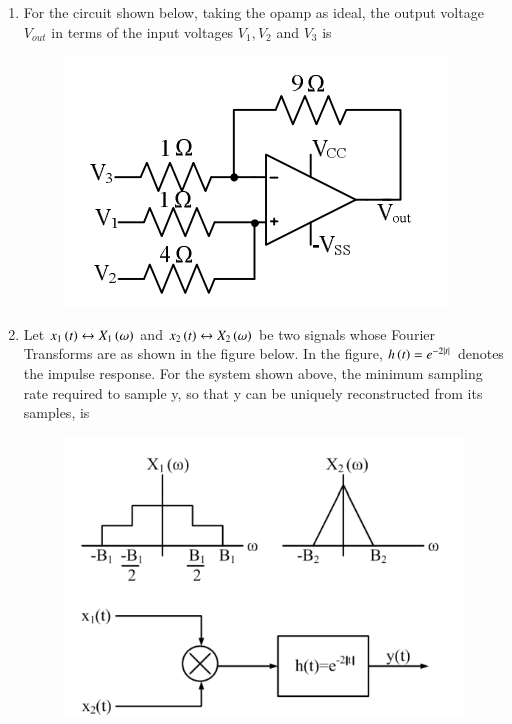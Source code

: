 \documentclass[journal,12pt,onecolumn]{IEEEtran}
\theoremstyle{remark}
\begin{document}
\begin{enumerate}[start=1, label=Q.\arabic*]
    \item For the circuit shown below, taking the opamp as ideal, the output voltage $V_{out}$ in terms of the input voltages $V_1, V_2$ and $V_3$ is
    \begin{figure}[H]
        \includegraphics[width=0.4\columnwidth]{Figures/2q27.png}
        \centering
        \caption{}
    \end{figure}
    \begin{enumerate}
    \end{enumerate}

    \hfill{}

    \item Let $x_1\left(t\right) \leftrightarrow X_1\left(\omega\right)$ and $x_2\left(t\right) \leftrightarrow X_2\left(\omega\right)$ be two signals whose Fourier Transforms are as shown in the figure below. In the figure, $h\left(t\right) = e^{-2|t|}$ denotes the impulse response. For the system shown above, the minimum sampling rate required to sample y, so that y can be uniquely reconstructed from its samples, is
    \begin{figure}[H]
        \includegraphics[width=0.4\columnwidth]{Figures/2q28.png}
        \centering
        \caption{}
    \end{figure}
    \begin{enumerate}
    \end{enumerate}


\end{enumerate}
\end{document}
